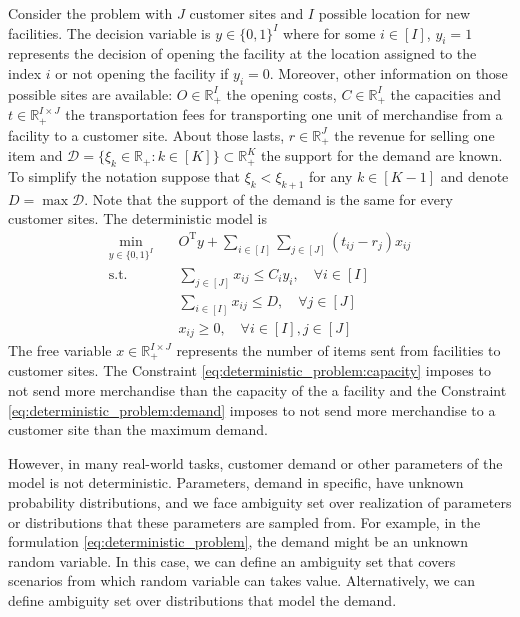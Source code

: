 \documentclass[12pt, letterpaper]{article}
\newcommand{\R}{\mathbb{R}}
\newcommand{\T}{\mathrm{T}}
\newcommand{\Dcal}{\mathcal{D}}
\begin{document}
	Consider the problem with $J$ customer sites and $I$ possible location for new facilities. The decision variable is $y \in \{0, 1\}^I$ where for some $i \in [I]$, $y_i = 1$ represents the decision of opening the facility at the location assigned to the index $i$ or not opening the facility if $y_i = 0$. Moreover, other information on those possible sites are available: $O \in \R_+^I$ the opening costs, $C \in \R_+^I$ the capacities and $t \in \R_+^{I \times J}$ the transportation fees for transporting one unit of merchandise from a facility to a customer site. About those lasts, $r \in \R_+^J$ the revenue for selling one item and $\Dcal = \{\xi_k \in \R_+: k \in [K]\} \subset \R_+^K$ the support for the demand are known. To simplify the notation suppose that $\xi_k < \xi_{k+1}$ for any $k \in [K-1]$ and denote $D = \max \Dcal$. Note that the support of the demand is the same for every customer sites. The deterministic model is
	\begin{subequations} \label{eq:deterministic_problem}
		\begin{align}
			\min_{y \in \{0, 1\}^I} &\quad O^\T y + \sum_{i \in [I]} \sum_{j \in [J]} (t_{ij} - r_j) x_{ij} \\
			\text{s.t.} &\quad \sum_{j \in [J]} x_{ij} \le C_i y_i, \quad \forall i \in [I] \\ \label{eq:deterministic_problem:capacity}
			&\quad \sum_{i \in [I]} x_{ij} \le D, \quad \forall j \in [J] \\ \label{eq:deterministic_problem:demand}
			&\quad x_{ij} \ge 0, \quad \forall i \in [I], j \in [J]
		\end{align}
	\end{subequations}
	The free variable $x \in \R_+^{I \times J}$ represents the number of items sent from facilities to customer sites. The Constraint \eqref{eq:deterministic_problem:capacity} imposes to not send more merchandise than the capacity of the a facility and the Constraint \eqref{eq:deterministic_problem:demand} imposes to not send more merchandise to a customer site than the maximum demand.
	
	However, in many real-world tasks, customer demand or other parameters of the model is not deterministic. Parameters, demand in specific, have unknown probability distributions, and we face ambiguity set over realization of parameters or distributions that these parameters are sampled from. For example, in the formulation \eqref{eq:deterministic_problem}, the demand might be an unknown random variable. In this case, we can define an ambiguity set that covers scenarios from which random variable can takes value. Alternatively, we can define ambiguity set over distributions that model the demand.
	
\end{document}
